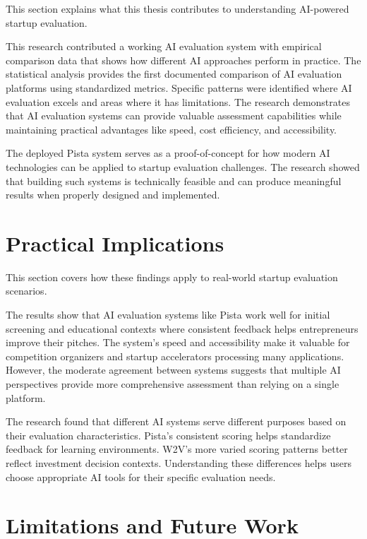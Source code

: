 This section explains what this thesis contributes to understanding AI-powered startup evaluation.

This research contributed a working AI evaluation system with empirical comparison data that shows how different AI approaches perform in practice. The statistical analysis provides the first documented comparison of AI evaluation platforms using standardized metrics. Specific patterns were identified where AI evaluation excels and areas where it has limitations. The research demonstrates that AI evaluation systems can provide valuable assessment capabilities while maintaining practical advantages like speed, cost efficiency, and accessibility.

The deployed Pista system serves as a proof-of-concept for how modern AI technologies can be applied to startup evaluation challenges. The research showed that building such systems is technically feasible and can produce meaningful results when properly designed and implemented.

\section{Practical Implications}
\label{sec:implications}

This section covers how these findings apply to real-world startup evaluation scenarios.

The results show that AI evaluation systems like Pista work well for initial screening and educational contexts where consistent feedback helps entrepreneurs improve their pitches. The system's speed and accessibility make it valuable for competition organizers and startup accelerators processing many applications. However, the moderate agreement between systems suggests that multiple AI perspectives provide more comprehensive assessment than relying on a single platform.

The research found that different AI systems serve different purposes based on their evaluation characteristics. Pista's consistent scoring helps standardize feedback for learning environments. W2V's more varied scoring patterns better reflect investment decision contexts. Understanding these differences helps users choose appropriate AI tools for their specific evaluation needs.

\section{Limitations and Future Work}
\label{sec:limitations}

